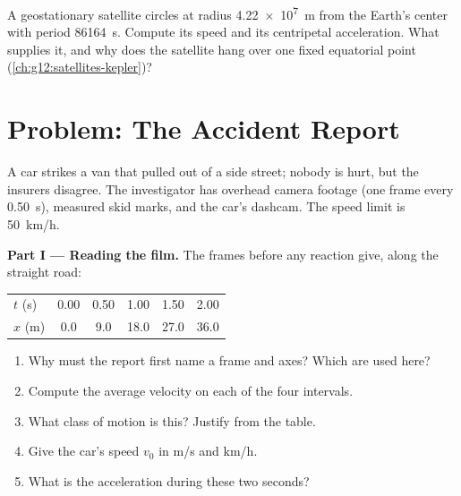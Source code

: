\begin{exercise}[$\star\star\star$]\label{exo:g12:kinematics-2d:15}
A geostationary satellite circles at radius \qty{4.22e7}{m} from the
Earth's center with period \qty{86164}{s}. Compute its speed and its
centripetal acceleration. What supplies it, and why does the satellite
hang over one fixed equatorial point (\cref{ch:g12:satellites-kepler})?
\end{exercise}

\section{Problem: The Accident Report}

\begin{problem}
\label{pb:g12:kinematics-2d:1}
A car strikes a van that pulled out of a side street; nobody is hurt,
but the insurers disagree. The investigator has overhead camera
footage (one frame every \qty{0.50}{s}), measured skid marks, and the
car's dashcam. The speed limit is \qty{50}{km/h}.

\medskip
\noindent\textbf{Part I --- Reading the film.}
The frames before any reaction give, along the straight road:
\begin{center}\small
\begin{tabular}{lccccc}
$t$ (\unit{s}) & 0.00 & 0.50 & 1.00 & 1.50 & 2.00\\
$x$ (\unit{m}) & 0.0 & 9.0 & 18.0 & 27.0 & 36.0
\end{tabular}
\end{center}
\begin{enumerate}
  \item Why must the report first name a frame and axes? Which are
        used here?
  \item Compute the average velocity on each of the four intervals.
  \item What class of motion is this? Justify from the table.
  \item Give the car's speed $v_0$ in \unit{m/s} and \unit{km/h}.
  \item What is the acceleration during these two seconds?
\end{enumerate}


\end{problem}
